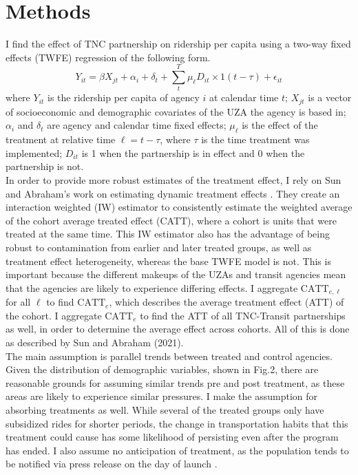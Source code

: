 \documentclass [12pt]{report}
\begin{document}
\section*{Methods}
I find the effect of TNC partnership on ridership per capita using a two-way fixed effects (TWFE) regression of the following form. $$Y_{it} = \beta X_{jt} + \alpha_i + \delta_t + \sum_{t}^T \mu_{\ell} D_{it} \times 1(t -\tau) + \epsilon_{it}$$ where $Y_{it}$ is the ridership per capita of agency $i$ at calendar time $t$; $X_{jt}$ is a vector of socioeconomic and demographic covariates of the UZA the agency is based in; $\alpha_i$ and $\delta_t$ are agency and calendar time fixed effects; $\mu_{\ell}$ is the effect of the treatment at relative time $\ell = t-\tau$, where $\tau$ is the time treatment was implemented; $D_{it}$ is 1 when the partnership is in effect and 0 when the partnership is not.\\
\indent In order to provide more robust estimates of the treatment effect, I rely on Sun and Abraham's work on estimating dynamic treatment effects \parencite{sunab}. They create an interaction weighted (IW) estimator to consistently estimate the weighted average of the cohort average treated effect (CATT), where a cohort is units that were treated at the same time. This IW estimator also has the advantage of being robust to contamination from earlier and later treated groups, as well as treatment effect heterogeneity, whereas the base TWFE model is not. This is important because the different makeups of the UZAs and transit agencies mean that the agencies are likely to experience differing effects. I aggregate $\text{CATT}_{e,\ell}$ for all $\ell$ to find $\text{CATT}_{e}$, which describes the average treatment effect (ATT) of the cohort. I aggregate $\text{CATT}_{e}$ to find the ATT of all TNC-Transit partnerships as well, in order to determine the average effect across cohorts. All of this is done as described by Sun and Abraham (2021). \\
\indent The main assumption is parallel trends between treated and control agencies. Given the distribution of demographic variables, shown in Fig.2, there are reasonable grounds for assuming similar trends pre and post treatment, as these areas are likely to experience similar pressures. I make the assumption for absorbing treatments as well. While several of the treated groups only have subsidized rides for shorter periods, the change in transportation habits that this treatment could cause has some likelihood of persisting even after the program has ended. I also assume no anticipation of treatment, as the population tends to be notified via press release on the day of launch \parencite{tampa}.  \\
\end{document}

